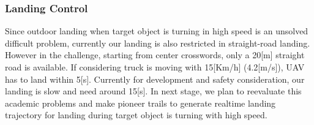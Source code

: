 \documentclass{standalone}
\begin{document}
\subsubsection{Landing Control}
Since outdoor landing when target object is turning in high speed is an unsolved difficult problem, currently our landing is also restricted in straight-road landing. However in the challenge, starting from center crosswords, only a 20[m] straight road is available. If considering truck is moving with 15[Km/h] (4.2[m/s]), UAV has to land within 5[s]. Currently for development and safety consideration, our landing is slow and need around 15[s].
In next stage, we plan to reevaluate this academic problems and make pioneer trails to generate realtime landing trajectory for landing during target object is turning with high speed.
\end{document}
